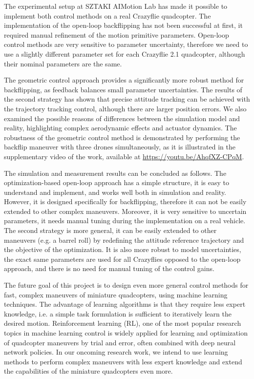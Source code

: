 The experimental setup at SZTAKI AIMotion Lab has made it possible to implement both control methods on a real Crazyflie quadcopter. The implementation of the open-loop backflipping has not been successful at first, it required manual refinement of the motion primitive parameters. Open-loop control methods are very sensitive to parameter uncertainty, therefore we need to use a slightly different parameter set for each Crazyflie 2.1 quadcopter, although their nominal parameters are the same. %

The geometric control approach provides a significantly more robust method for backflipping, as feedback balances small parameter uncertainties. The results of the second strategy has shown that precise attitude tracking can be achieved with the trajectory tracking control, although there are larger position errors. We also examined the possible reasons of differences between the simulation model and reality, highlighting complex aerodynamic effects and actuator dynamics. The robustness of the geometric control method is demonstrated by performing the backflip maneuver with three drones simultaneously, as it is illustrated in the supplementary video of the work, available at \url{https://youtu.be/AhqfXZ-CPqM}.

The simulation and measurement results can be concluded as follows. The optimization-based open-loop approach has a simple structure, it is easy to understand and implement, and works well both in simulation and reality. However, it is designed specifically for backflipping, therefore it can not be easily extended to other complex maneuvers. Moreover, it is very sensitive to uncertain parameters, it needs manual tuning during the implementation on a real vehicle. The second strategy is more general, it can be easily extended to other maneuvers (e.g. a barrel roll) by redefining the attitude reference trajectory and the objective of the optimization. It is also more robust to model uncertainties, the exact same parameters are used for all Crazyflies opposed to the open-loop approach, and there is no need for manual tuning of the control gains.

The future goal of this project is to design even more general control methods for fast, complex maneuvers of miniature quadcopters, using machine learning techniques. The advantage of learning algorithms is that they require less expert knowledge, i.e. a simple task formulation is sufficient to iteratively learn the desired motion. Reinforcement learning (RL), one of the most popular research topics in machine learning control is widely applied for learning and optimization of quadcopter maneuvers by trial and error, often combined with deep neural network policies. In our oncoming research work, we intend to use learning methods to perform complex maneuvers with less expert knowledge and extend the capabilities of the miniature quadcopters even more.

